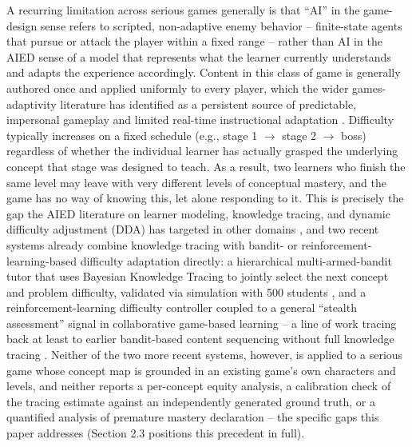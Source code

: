 \documentclass[11pt]{article}
\begin{document}
A recurring limitation across serious games generally is that ``AI'' in the game-design sense refers to scripted, non-adaptive enemy behavior -- finite-state agents that pursue or attack the player within a fixed range -- rather than AI in the AIED sense of a model that represents what the learner currently understands and adapts the experience accordingly. Content in this class of game is generally authored once and applied uniformly to every player, which the wider games-adaptivity literature has identified as a persistent source of predictable, impersonal gameplay and limited real-time instructional adaptation \cite{ref3,ref24}. Difficulty typically increases on a fixed schedule (e.g., stage 1 $\to$ stage 2 $\to$ boss) regardless of whether the individual learner has actually grasped the underlying concept that stage was designed to teach. As a result, two learners who finish the same level may leave with very different levels of conceptual mastery, and the game has no way of knowing this, let alone responding to it. This is precisely the gap the AIED literature on learner modeling, knowledge tracing, and dynamic difficulty adjustment (DDA) has targeted in other domains \cite{ref16,ref17,ref22}, and two recent systems already combine knowledge tracing with bandit- or reinforcement-learning-based difficulty adaptation directly: a hierarchical multi-armed-bandit tutor that uses Bayesian Knowledge Tracing to jointly select the next concept and problem difficulty, validated via simulation with 500 students \cite{ref39}, and a reinforcement-learning difficulty controller coupled to a general ``stealth assessment'' signal in collaborative game-based learning \cite{ref40} -- a line of work tracing back at least to earlier bandit-based content sequencing without full knowledge tracing \cite{ref41}. Neither of the two more recent systems, however, is applied to a serious game whose concept map is grounded in an existing game's own characters and levels, and neither reports a per-concept equity analysis, a calibration check of the tracing estimate against an independently generated ground truth, or a quantified analysis of premature mastery declaration -- the specific gaps this paper addresses (Section 2.3 positions this precedent in full).
\end{document}
